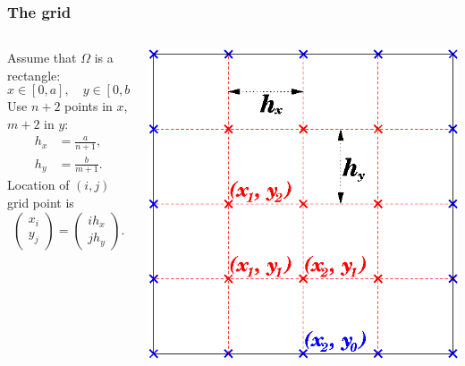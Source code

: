 \documentclass{beamer}
\begin{document}
\begin{frame}
  \frametitle{The grid}

  \begin{columns}
    \begin{column}{0.5\textwidth}
      Assume that $\Omega$ is a rectangle:
      \begin{equation*}
        x \in [0,a], \quad y \in [0, b].
      \end{equation*}
      Use $n+2$ points in $x$, $m+2$ in $y$:
      \begin{align*}
        h_x & = \frac{a}{n + 1}, \\
        h_y & = \frac{b}{m + 1}.
      \end{align*}
      Location of $(i,j)$ grid point is
      \begin{equation*}
        \begin{pmatrix}
          x_{i} \\ y_{j}
        \end{pmatrix} =
        \begin{pmatrix}
          i h_x \\ j h_y
        \end{pmatrix}.
      \end{equation*}
    \end{column}
    \begin{column}{0.5\textwidth}
      \begin{center}
        \includegraphics[width=\textwidth]{figures/Grid1_Elliptic}
      \end{center}
    \end{column}
  \end{columns}

\end{frame}
\end{document}
